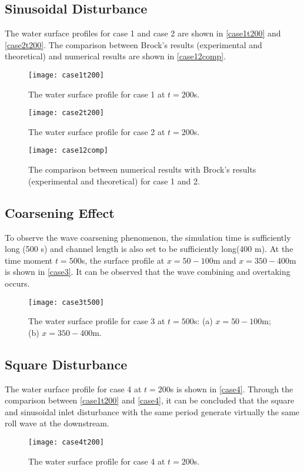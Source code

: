 \documentclass[a4paper]{article}
\begin{document}
\subsection{Sinusoidal Disturbance}
The water surface profiles for case 1 and case 2 are shown in \autoref{case1t200} and \autoref{case2t200}. The comparison between Brock's results (experimental and theoretical) and numerical results are shown in \autoref{case12comp}.

\begin{figure}[htbp]
\centering
\texttt{[image: case1t200]}
\caption{The water surface profile for case 1 at $t=200$s.}
\label{case1t200}
\end{figure}


\begin{figure}[htbp]
\centering
\texttt{[image: case2t200]}
\caption{The water surface profile for case 2 at $t=200$s.}
\label{case2t200}
\end{figure}

\begin{figure}[htbp]
\centering
\texttt{[image: case12comp]}
\caption{The comparison between numerical results with Brock's results (experimental and theoretical) for case 1 and 2.}
\label{case12comp}
\end{figure}

\subsection{Coarsening Effect}
To observe the wave coarsening phenomenon, the simulation time is sufficiently long (500 s) and channel length is also set to be sufficiently long(400 m). At the time moment $t=500$s, the surface profile at $x=50-100$m and $x=350-400$m  is shown in \autoref{case3}. It can be observed that the wave combining and overtaking occurs.

\begin{figure}[htbp]
\centering
\texttt{[image: case3t500]}
\caption{The water surface profile for case 3 at $t=500$s: (a) $x=50-100$m; (b) $x=350-400$m.}
\label{case3}
\end{figure}

\subsection{Square Disturbance}
The water surface profile for case 4 at $t=200$s is shown in \autoref{case4}. Through the comparison between \autoref{case1t200} and \autoref{case4}, it can be concluded that the square and sinusoidal inlet disturbance with the same period generate virtually the same roll wave at the downstream.
\begin{figure}[htbp]
\centering
\texttt{[image: case4t200]}
\caption{The water surface profile for case 4 at $t=200$s.}
\label{case4}
\end{figure}

\end{document}
